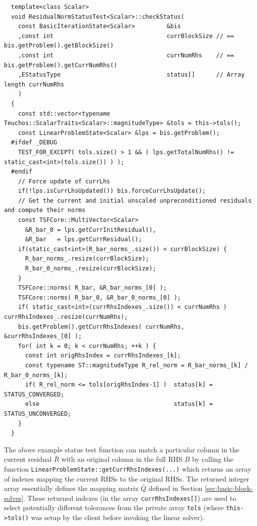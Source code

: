 \documentclass[pdf,ps2pdf,11pt]{SANDreport}
\begin{document}
\begin{enumerate}
{\scriptsize\begin{verbatim}
  template<class Scalar>
  void ResidualNormStatusTest<Scalar>::checkStatus(
    const BasicIterationState<Scalar>         &bis
    ,const int                                currBlockSize // == bis.getProblem().getBlockSize()
    ,const int                                currNumRhs    // == bis.getProblem().getCurrNumRhs()
    ,EStatusType                              status[]      // Array length currNumRhs
    )
  {
    const std::vector<typename Teuchos::ScalarTraits<Scalar>::magnitudeType> &tols = this->tols();
    const LinearProblemState<Scalar> &lps = bis.getProblem();
  #ifdef _DEBUG
    TEST_FOR_EXCEPT( tols.size() > 1 && ( lps.getTotalNumRhs() != static_cast<int>(tols.size()) ) );
  #endif
    // Force update of currLhs
    if(!lps.isCurrLhsUpdated()) bis.forceCurrLhsUpdate();  
    // Get the current and initial unscaled unpreconditioned residuals and compute their norms
    const TSFCore::MultiVector<Scalar>
      &R_bar_0 = lps.getCurrInitResidual(),
      &R_bar   = lps.getCurrResidual();
    if(static_cast<int>(R_bar_norms_.size()) < currBlockSize) {
      R_bar_norms_.resize(currBlockSize);
      R_bar_0_norms_.resize(currBlockSize);
    }
    TSFCore::norms( R_bar, &R_bar_norms_[0] );
    TSFCore::norms( R_bar_0, &R_bar_0_norms_[0] );
    if( static_cast<int>(currRhsIndexes_.size()) < currNumRhs ) currRhsIndexes_.resize(currNumRhs);
    bis.getProblem().getCurrRhsIndexes( currNumRhs, &currRhsIndexes_[0] );
    for( int k = 0; k < currNumRhs; ++k ) {
      const int origRhsIndex = currRhsIndexes_[k];
      const typename ST::magnitudeType R_rel_norm = R_bar_norms_[k] / R_bar_0_norms_[k];
      if( R_rel_norm <= tols[origRhsIndex-1] )  status[k] = STATUS_CONVERGED;
      else                                      status[k] = STATUS_UNCONVERGED;
    }
  }
\end{verbatim}}

The above example status test function can match a particular column
in the current residual $\bar{R}$ with an original column in the full
RHS $B$ by calling the function
{}\texttt{Linear\-Problem\-State::\-get\-Curr\-Rhs\-Indexes(...)}
which returns an array of indexes mapping the current RHSs to the
original RHSs.  The returned integer array essentially defines the
mapping matrix $\bar{Q}$ defined in Section
{}\ref{sec:basic-block-solves}.  These returned indexes (in the array
{}\texttt{currRhsIndexes[]}) are used to select potentially different
tolerances from the private array {}\texttt{tols} (where
{}\texttt{this->tols()} was setup by the client before invoking the
linear solver).


\end{enumerate}
\end{document}
